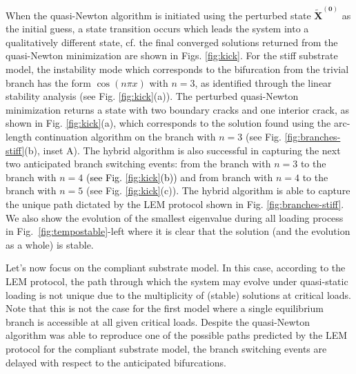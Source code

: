 When the quasi-Newton algorithm is initiated using the perturbed state \(\mathbf{\tilde X^{(0)}}\) as the initial guess, {a state transition} occurs which leads the system into a qualitatively different state, cf. the final  converged solutions returned from the quasi-Newton minimization are shown in  Figs. \ref{fig:kick}. For the stiff substrate model, the {instability mode} which corresponds to the bifurcation from the trivial branch has the form \(\cos(n\pi x)\) with \(n=3\), as identified through the linear stability analysis (see Fig. {\ref{fig:kick}(a))}.
The perturbed quasi-Newton minimization returns a state with two boundary cracks and one interior crack, as shown in Fig. {\ref{fig:kick}(a)}, which corresponds to the solution found using the arc-length continuation algorithm on the branch with \(n=3\) (see Fig. \ref{fig:branches-stiff}(b), inset A).  The hybrid algorithm is also successful in capturing the next two anticipated branch   switching events: from the  branch with \(n=3\)  to the branch  with \(n=4\) \textcolor{black}{(see Fig. \ref{fig:kick}(b))} and  from branch with \(n=4\)  to the branch  with \(n=5\) {(see Fig. \ref{fig:kick}(c))}. The hybrid algorithm is able to capture the unique path dictated by the LEM protocol shown in Fig. \ref{fig:branches-stiff}. {We also show the evolution of the smallest eigenvalue during all loading process in Fig.~\ref{fig:tempostable}-left where  it is clear that  the solution (and the evolution as a whole) is stable.}

Let's now  focus on the compliant substrate model. In this case, according to the LEM protocol, the path through which the system may evolve under quasi-static loading is not unique due to the multiplicity of (stable) solutions at critical loads.
Note that this is not the case for the first model where a single equilibrium branch is accessible at all given critical loads.
Despite the quasi-Newton algorithm was able to reproduce one of the possible paths predicted by the LEM protocol for the compliant substrate model,  {the branch switching events} {are delayed with respect to the} anticipated bifurcations.

